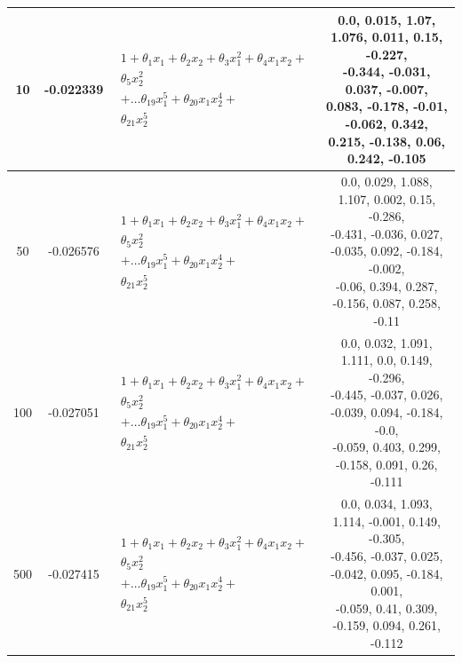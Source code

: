 \documentclass[10pt]{article}
\begin{document}
\begin{table}[H]
\begin{center}
\begin{tabular}{ |c|c|c|c| }
      \hline
      10   & -0.022339 & $\begin{aligned}1 + \theta_{1}x_{1} + \theta_{2}x_{2} + \theta_{3}x_{1}^{2}+ \theta_{4}x_{1}x_{2}+\\\nonumber \theta_{5}x_{2}^{2}\\\nonumber+\dots \theta_{19}x_{1}^{5}+ \theta_{20}x_{1}x_{2}^{4}+ \\\nonumber \theta_{21}x_{2}^{5}\end{aligned}$ & \makecell{0.0, 0.015, 1.07, 1.076, 0.011, 0.15, -0.227,    \\-0.344, -0.031, 0.037, -0.007, 0.083, -0.178, -0.01, \\-0.062, 0.342, 0.215, -0.138, 0.06, 0.242, -0.105} \\
      \hline
      50   & -0.026576 & $\begin{aligned}1 + \theta_{1}x_{1} + \theta_{2}x_{2} + \theta_{3}x_{1}^{2}+ \theta_{4}x_{1}x_{2}+\\\nonumber \theta_{5}x_{2}^{2}\\\nonumber+\dots \theta_{19}x_{1}^{5}+ \theta_{20}x_{1}x_{2}^{4}+ \\\nonumber \theta_{21}x_{2}^{5}\end{aligned}$ & \makecell{0.0, 0.029, 1.088, 1.107, 0.002, 0.15, -0.286,   \\-0.431, -0.036, 0.027, -0.035, 0.092, -0.184, -0.002, \\-0.06, 0.394, 0.287, -0.156, 0.087, 0.258, -0.11} \\
      \hline
      100  & -0.027051 & $\begin{aligned}1 + \theta_{1}x_{1} + \theta_{2}x_{2} + \theta_{3}x_{1}^{2}+ \theta_{4}x_{1}x_{2}+\\\nonumber \theta_{5}x_{2}^{2}\\\nonumber+\dots \theta_{19}x_{1}^{5}+ \theta_{20}x_{1}x_{2}^{4}+ \\\nonumber \theta_{21}x_{2}^{5}\end{aligned}$ & \makecell{0.0, 0.032, 1.091, 1.111, 0.0, 0.149, -0.296,    \\-0.445, -0.037, 0.026, -0.039, 0.094, -0.184, -0.0, \\-0.059, 0.403, 0.299, -0.158, 0.091, 0.26, -0.111} \\
      \hline
      500  & -0.027415 & $\begin{aligned}1 + \theta_{1}x_{1} + \theta_{2}x_{2} + \theta_{3}x_{1}^{2}+ \theta_{4}x_{1}x_{2}+\\\nonumber \theta_{5}x_{2}^{2}\\\nonumber+\dots \theta_{19}x_{1}^{5}+ \theta_{20}x_{1}x_{2}^{4}+ \\\nonumber \theta_{21}x_{2}^{5}\end{aligned}$ & \makecell{0.0, 0.034, 1.093, 1.114, -0.001, 0.149, -0.305, \\-0.456, -0.037, 0.025, -0.042, 0.095, -0.184, 0.001, \\-0.059, 0.41, 0.309, -0.159, 0.094, 0.261, -0.112} \\

\end{tabular}
\end{center}
\end{table}
\end{document}
